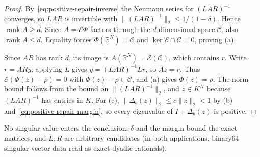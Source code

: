 \begin{proof}
By~\eqref{eq:positive-repair-inverse} the Neumann series for $(LAR)^{-1}$ converges, so
$LAR$ is invertible with $\|(LAR)^{-1}\|_2\le1/(1-\delta)$. Hence $\operatorname{rank}A\ge d$.
Since $A=\mathcal E\Phi$ factors through the $d$-dimensional space $\mathcal C$, also
$\operatorname{rank}A\le d$. Equality forces $\Phi(\mathbb R^N)=\mathcal C$ and
$\ker\mathcal E\cap\mathcal C=0$, proving (a).

Since $AR$ has rank $d$, its image is $A(\mathbb R^N)=\mathcal E(\mathcal C)$, which
contains $r$. Write $r=ARy$; applying $L$ gives $y=(LAR)^{-1}Lr$, so $Az=r$. Thus
$\mathcal E(\Phi(z)-\rho)=0$ with $\Phi(z)-\rho\in\mathcal C$, and (a) gives $\Phi(z)=\rho$.
The norm bound follows from the bound on $\|(LAR)^{-1}\|_2$, and $z\in K^N$ because
$(LAR)^{-1}$ has entries in $K$. For (c),
$\|\Delta_b(z)\|_2\le c\|z\|_2<1$ by (b) and~\eqref{eq:positive-repair-margin}, so every
eigenvalue of $I+\Delta_b(z)$ is positive.
\end{proof}
No singular value enters the conclusion: $\delta$ and the margin bound the exact matrices,
and $L,R$ are arbitrary candidates (in both applications, binary64 singular-vector data read
as exact dyadic rationals).
